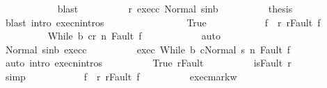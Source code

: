 \begin{isabellebody}
\ \ \ \ \ \ \ \ \ \ \isamarkupfalse%
\ blast\isanewline
\ \ \ \ \ \ \ \ \isamarkupfalse%
\ r{\isacharprime}\ exec{\isacharunderscore}c\ Normal\ s{\isacharprime}{\isacharunderscore}in{\isacharunderscore}b\isanewline
\ \ \ \ \ \ \ \ \isamarkupfalse%
\ {\isacharquery}thesis\isanewline
\ \ \ \ \ \ \ \ \ \ \isamarkupfalse%
\ {\isacharparenleft}blast\ intro{\isacharcolon}\ execn{\isachardot}intros{\isacharparenright}\isanewline
\ \ \ \ \ \ \isamarkupfalse%
\isanewline
\ \ \ \ \ \ \ \ \isamarkupfalse%
\ True\isanewline
\ \ \ \ \ \ \ \ \isamarkupfalse%
\ \isamarkupfalse%
\ f{\isacharprime}\ \ r{\isacharprime}{\isacharcolon}\ {\isachardoublequoteopen}r{\isacharprime}{\isacharequal}Fault\ f{\isacharprime}{\isachardoublequoteclose}\isacommand{{\isachardot}{\isachardot}}\isamarkupfalse%
\isanewline
\ \ \ \ \ \ \ \ \isamarkupfalse%
\ {\isachardoublequoteopen}{\isasymGamma}{\isasymturnstile}{\isasymlangle}While\ b\ c{\isacharcomma}r{\isacharprime}{\isasymrangle}\ {\isacharequal}n{\isasymRightarrow}\ Fault\ f{\isacharprime}{\isachardoublequoteclose}\isanewline
\ \ \ \ \ \ \ \ \ \ \isamarkupfalse%
\ auto\ \isanewline
\ \ \ \ \ \ \ \ \isamarkupfalse%
\ Normal\ s{\isacharprime}{\isacharunderscore}in{\isacharunderscore}b\ exec{\isacharunderscore}c\isanewline
\ \ \ \ \ \ \ \ \isamarkupfalse%
\ exec{\isacharcolon}\ {\isachardoublequoteopen}{\isasymGamma}{\isasymturnstile}{\isasymlangle}While\ b\ c{\isacharcomma}Normal\ s{\isacharprime}{\isasymrangle}\ {\isacharequal}n{\isasymRightarrow}\ Fault\ f{\isacharprime}{\isachardoublequoteclose}\isanewline
\ \ \ \ \ \ \ \ \ \ \isamarkupfalse%
\ {\isacharparenleft}auto\ intro{\isacharcolon}\ execn{\isachardot}intros{\isacharparenright}\isanewline
\ \ \ \ \ \ \ \ \isamarkupfalse%
\ True\ r{\isacharprime}{\isacharunderscore}Fault\isanewline
\ \ \ \ \ \ \ \ \isamarkupfalse%
\ {\isachardoublequoteopen}isFault\ r{\isachardoublequoteclose}\isanewline
\ \ \ \ \ \ \ \ \ \ \isamarkupfalse%
\ simp\isanewline
\ \ \ \ \ \ \ \ \isamarkupfalse%
\ \isamarkupfalse%
\ f\ \ r{\isacharcolon}\ {\isachardoublequoteopen}r{\isacharequal}Fault\ f{\isachardoublequoteclose}\isacommand{{\isachardot}{\isachardot}}\isamarkupfalse%
\isanewline
\ \ \ \ \ \ \ \ \isamarkupfalse%
\ exec{\isacharunderscore}mark{\isacharunderscore}w\ \isamarkupfalse%

\end{isabellebody}
